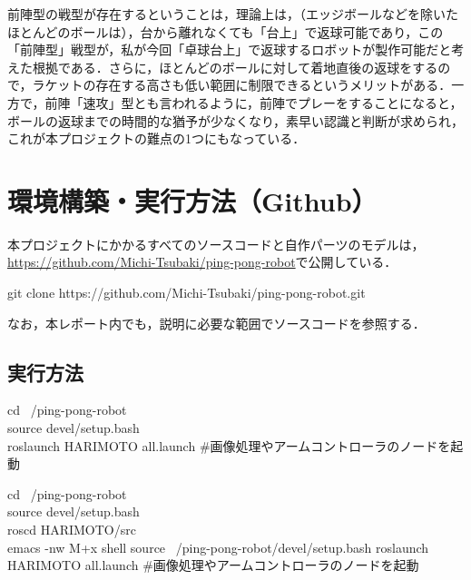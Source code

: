\documentclass[11pt, oneside, titlepage]{jarticle}
\begin{document}
前陣型の戦型が存在するということは，理論上は，（エッジボールなどを除いたほとんどのボールは），台から離れなくても「台上」で返球可能であり，この「前陣型」戦型が，私が今回「卓球台上」で返球するロボットが製作可能だと考えた根拠である．さらに，ほとんどのボールに対して着地直後の返球をするので，ラケットの存在する高さも低い範囲に制限できるというメリットがある．一方で，前陣「速攻」型とも言われるように，前陣でプレーをすることになると，ボールの返球までの時間的な猶予が少なくなり，素早い認識と判断が求められ，これが本プロジェクトの難点の1つにもなっている．

\section{環境構築・実行方法（Github）}
本プロジェクトにかかるすべてのソースコードと自作パーツのモデルは， \url{https://github.com/Michi-Tsubaki/ping-pong-robot}で公開している．
\begin{screen}
git clone https://github.com/Michi-Tsubaki/ping-pong-robot.git
\end{screen}

なお，本レポート内でも，説明に必要な範囲でソースコードを参照する．

\subsection{実行方法}
\begin{screen}
cd ~/ping-pong-robot\\
source devel/setup.bash \\
roslaunch HARIMOTO all.launch \#画像処理やアームコントローラのノードを起動
\end{screen}
\begin{screen}
cd ~/ping-pong-robot\\
source devel/setup.bash \\
roscd HARIMOTO/src \\
emacs -nw 
M+x shell
source ~/ping-pong-robot/devel/setup.bash
roslaunch HARIMOTO all.launch \#画像処理やアームコントローラのノードを起動
\end{screen}
\end{document}
